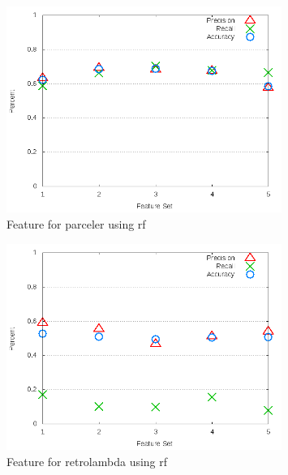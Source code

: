 \begin{figure}[!t]
\centering
\includegraphics[width=0.8\textwidth]{images/rf/test_3/parceler_sample_range.png}
\caption{Feature for parceler using \gls{rf}}
\label{fig:test_3_parceler_rf}
\end{figure}

\begin{figure}[!t]
\centering
\includegraphics[width=0.8\textwidth]{images/rf/test_3/retrolambda_sample_range.png}
\caption{Feature for retrolambda using \gls{rf}}
\label{fig:test_3_retrolambda_rf}
\end{figure}

